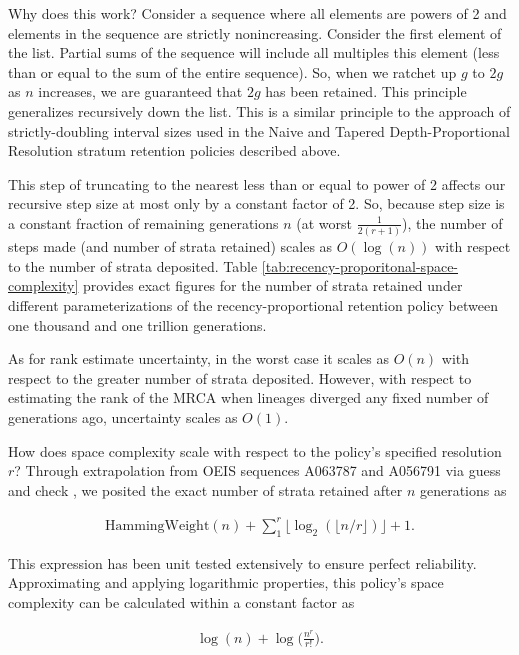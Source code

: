 Why does this work?
Consider a sequence where all elements are powers of 2 and elements in the sequence are strictly nonincreasing.
Consider the first element of the list.
Partial sums of the sequence will include all multiples this element (less than or equal to the sum of the entire sequence).
So, when we ratchet up $g$ to $2g$ as $n$ increases, we are guaranteed that $2g$ has been retained.
This principle generalizes recursively down the list.
This is a similar principle to the approach of strictly-doubling interval sizes used in the Naive and Tapered Depth-Proportional Resolution stratum retention policies described above.

This step of truncating to the nearest less than or equal to power of 2 affects our recursive step size at most only by a constant factor of 2.
So, because step size is a constant fraction of remaining generations $n$ (at worst $\frac{1}{2(r+1)}$), the number of steps made (and number of strata retained) scales as $O(\log(n))$ with respect to the number of strata deposited.
Table \ref{tab:recency-proporitonal-space-complexity} provides exact figures for the number of strata retained under different parameterizations of the recency-proportional retention policy between one thousand and one trillion generations.

As for rank estimate uncertainty, in the worst case it scales as $O(n)$ with respect to the greater number of strata deposited.
However, with respect to estimating the rank of the MRCA when lineages diverged any fixed number of generations ago, uncertainty scales as $O(1)$.

How does space complexity scale with respect to the policy's specified resolution $r$?
Through extrapolation from OEIS sequences A063787 and A056791 via guess and check \citep{sloane2021a063787,sloane2021a056791}, we posited the exact number of strata retained after $n$ generations as

\begin{align*}
  \mathrm{HammingWeight}(n)
  + \sum_1^r \lfloor \log_2( \lfloor n / r \rfloor ) \rfloor
  + 1.
\end{align*}

This expression has been unit tested extensively to ensure perfect reliability.
Approximating and applying logarithmic properties, this policy's space complexity can be calculated within a constant factor as

\begin{align*}
\log(n) + \log\Big(\frac{n^r}{r!}\Big).
\end{align*}

